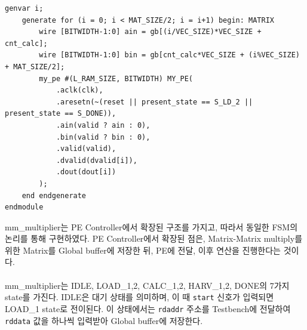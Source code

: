 \documentclass{article}
\begin{document}
\begin{lstlisting}[style={verilog-style}]
    genvar i;
    generate for (i = 0; i < MAT_SIZE/2; i = i+1) begin: MATRIX
        wire [BITWIDTH-1:0] ain = gb[(i/VEC_SIZE)*VEC_SIZE + cnt_calc];
        wire [BITWIDTH-1:0] bin = gb[cnt_calc*VEC_SIZE + (i%VEC_SIZE) + MAT_SIZE/2];
        my_pe #(L_RAM_SIZE, BITWIDTH) MY_PE(
            .aclk(clk),
            .aresetn(~(reset || present_state == S_LD_2 || present_state == S_DONE)),
            .ain(valid ? ain : 0),
            .bin(valid ? bin : 0),
            .valid(valid),
            .dvalid(dvalid[i]),
            .dout(dout[i])
        );
    end endgenerate
endmodule
\end{lstlisting}

mm\_multiplier는 PE Controller에서 확장된 구조를 가지고, 따라서 동일한 FSM의 논리를 통해 구현하였다. PE Controller에서 확장된 점은, Matrix-Matrix multiply를 위한 Matrix를 Global buffer에 저장한 뒤, PE에 전달, 이후 연산을 진행한다는 것이다.\\\\
mm\_multiplier는 IDLE, LOAD\_1,2, CALC\_1,2, HARV\_1,2, DONE의 7가지 state를 가진다. IDLE은 대기 상태를 의미하며, 이 때 \texttt{start} 신호가 입력되면 LOAD\_1 state로 전이된다. 이 상태에서는 \texttt{rdaddr} 주소를 Testbench에 전달하여 \texttt{rddata} 값을 하나씩 입력받아 Global buffer에 저장한다.
\end{document}
